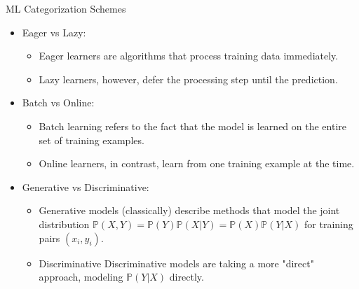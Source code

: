 \documentclass[compress,oilve]{beamer}
\newcommand{\tc}[2]{
	\textcolor{#1}{#2}
}
\begin{document}
\begin{frame}{ML Categorization Schemes}
	\begin{itemize}
		\item Eager vs Lazy:
		\begin{itemize}
			\item \tc{keywords}{Eager}learners are algorithms that process training data immediately.
			
			\item \tc{keywords}{Lazy}learners, however, defer the processing step until the prediction. 
			
		\end{itemize}
	
	\medskip
		\item Batch vs Online:
		
		\begin{itemize}
			\item \tc{keywords}{Batch}learning refers to the fact that the model is learned on the entire set of training examples.
			
			\item \tc{keywords}{Online}learners, in contrast, learn from one training example at the time. 
			
		\end{itemize}
	
		\medskip
		\item Generative vs Discriminative:
		
				
		\begin{itemize}
			\item \tc{keywords}{Generative} models (classically) describe methods that
			model the joint distribution $\mathbb{P}(X, Y ) = \mathbb{P}(Y )\mathbb{P}(X|Y ) = \mathbb{P}(X)\mathbb{P}(Y|X)$ for training pairs $(x_i, y_i)$.
			
			
			\item \tc{keywords}{Discriminative}Discriminative models are taking a more "direct" approach, modeling $\mathbb{P}(Y|X)$ directly. 
			
		\end{itemize}
	\end{itemize}
\end{frame}
\end{document}
